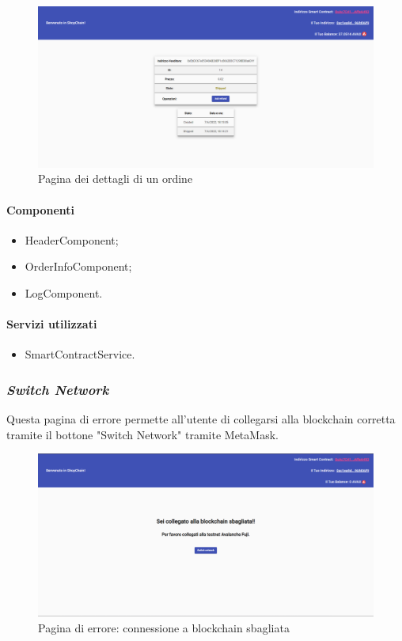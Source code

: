 \begin{figure}[!h] 
    \centering 
    \includegraphics[width=1\columnwidth]{immagini/maschere/orderinfo.png} 
    \caption{Pagina dei dettagli di un ordine}
\end{figure}

\paragraph{Componenti}
\begin{itemize}
    \item HeaderComponent;
    \item OrderInfoComponent;
    \item LogComponent.
\end{itemize}

\paragraph{Servizi utilizzati}
\begin{itemize}
    \item SmartContractService.
\end{itemize}

\newpage

\subsubsection*{\textit{Switch Network}}
Questa pagina di errore permette all'utente di collegarsi alla blockchain corretta tramite il bottone "Switch Network" tramite MetaMask.

\begin{figure}[!h] 
    \centering 
    \includegraphics[width=1\columnwidth]{immagini/maschere/switchNetwork.png} 
    \caption{Pagina di errore: connessione a blockchain sbagliata}
\end{figure}


